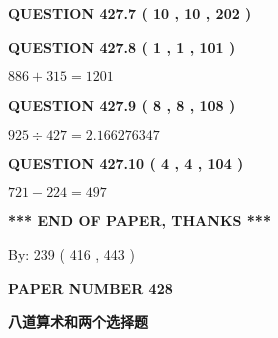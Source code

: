 \documentclass{ctexart}
\begin{document}
 
  
\vspace{0.2in}
  
{\textbf{\Large{QUESTION
427.7 
 ( 10 , 10 , 202 )
}}}
  
  
  
\vspace{0.2in}
  
{\textbf{\Large{QUESTION
427.8 
 ( 1 , 1 , 101 )
}}}
  
  
 
 

$ %
886 +  %
315=   %
1201$
 
 
  
\vspace{0.2in}
  
{\textbf{\Large{QUESTION
427.9 
 ( 8 , 8 , 108 )
}}}
  
  
 
 

$ %
925 \div  %
427=   %
2.166276347$
 
 
  
\vspace{0.2in}
  
{\textbf{\Large{QUESTION
427.10 
 ( 4 , 4 , 104 )
}}}
  
  
 
 

$ %
721 -  %
224=   %
497$
 
 
   
   
 \vspace{0.2in}
 
   
   
   
   
\vspace{1.0in} 
{\textbf{\large{ *** END OF PAPER, THANKS *** }}} 
   
   
\hspace{1.0in} By: 
 239 ( 416 ,  443 )
   
   
   
   
\newpage 
\setcounter{page}{ 
   428001 } 
   
   
   
   
 {\textbf{ \Large{ PAPER NUMBER  428  }}}
   
   
\vspace{0.2in}
   
   
   
   
   
   
 \vspace{0.2in}
{\LARGE {\textbf{ 八道算术和两个选择题}}}
   
\end{document}
